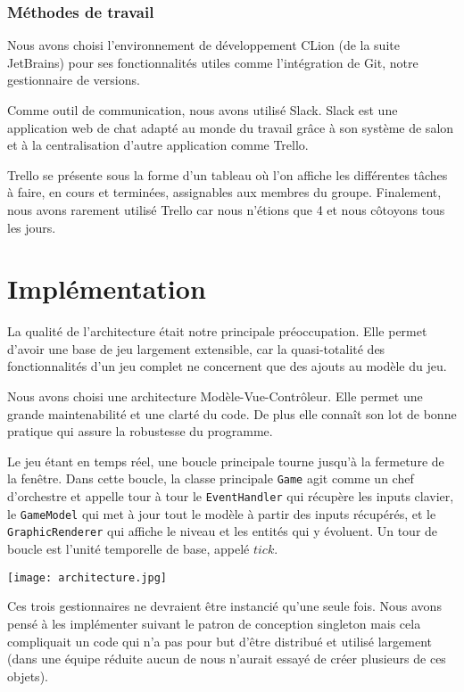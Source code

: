 \documentclass[a4paper,11pt]{article}
\begin{document}
\subsubsection*{Méthodes de travail}
Nous avons choisi l'environnement de développement CLion (de la suite JetBrains) pour ses fonctionnalités utiles comme l'intégration de Git, notre gestionnaire de versions.

Comme outil de communication, nous avons utilisé Slack. Slack est une application web de chat adapté au monde du travail grâce à son système de salon et à la centralisation d'autre application comme Trello.

Trello se présente sous la forme d'un tableau où l'on affiche les différentes tâches à faire, en cours et terminées, assignables aux membres du groupe.
Finalement, nous avons rarement utilisé Trello car nous n'étions que 4 et nous côtoyons tous les jours.

\section{Implémentation}
La qualité de l'architecture était notre principale préoccupation. Elle permet d'avoir une base de jeu largement extensible, car la quasi-totalité des fonctionnalités d'un jeu complet ne concernent que des ajouts au modèle du jeu.

Nous avons choisi une architecture Modèle-Vue-Contrôleur. Elle permet une grande maintenabilité et une clarté du code. De plus elle connaît son lot de bonne pratique qui assure la robustesse du programme.

Le jeu étant en temps réel, une boucle principale tourne jusqu'à la fermeture de la fenêtre. Dans cette boucle, la classe principale \texttt{Game} agit comme un chef d'orchestre et appelle tour à tour le \texttt{EventHandler} qui récupère les inputs clavier, le \texttt{GameModel} qui met à jour tout le modèle à partir des inputs récupérés, et le \texttt{GraphicRenderer} qui affiche le niveau et les entités qui y évoluent. Un tour de boucle est l'unité temporelle de base, appelé $tick$.

\begin{center}
\texttt{[image: architecture.jpg]}
\end{center}





Ces trois gestionnaires ne devraient être instancié qu'une seule fois. Nous avons pensé à les implémenter suivant le patron de conception singleton mais cela compliquait un code qui n'a pas pour but d'être distribué et utilisé largement (dans une équipe réduite aucun de nous n'aurait essayé de créer plusieurs de ces objets).
\end{document}

